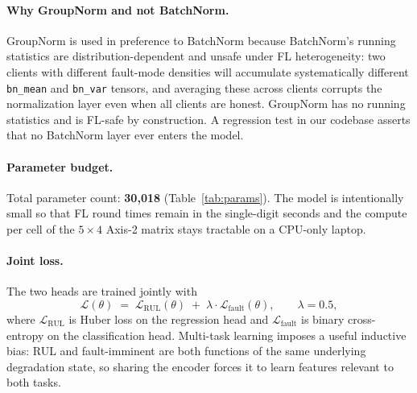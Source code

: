 \documentclass[preprint,12pt,authoryear]{elsarticle}
\begin{document}
\paragraph{Why GroupNorm and not BatchNorm.}
GroupNorm is used in preference to BatchNorm because BatchNorm's
running statistics are distribution-dependent and unsafe under FL
heterogeneity: two clients with different fault-mode densities will
accumulate systematically different \texttt{bn\_mean} and
\texttt{bn\_var} tensors, and averaging these across clients
corrupts the normalization layer even when all clients are honest.
GroupNorm has no running statistics and is FL-safe by construction.
A regression test in our codebase asserts that no BatchNorm layer
ever enters the model.

\paragraph{Parameter budget.}
Total parameter count: \textbf{30{,}018} (Table~\ref{tab:params}).
The model is intentionally small so that FL round times remain in
the single-digit seconds and the compute per cell of the
$5 \times 4$ Axis-2 matrix stays tractable on a CPU-only laptop.

\paragraph{Joint loss.}
The two heads are trained jointly with
\begin{equation}
    \mathcal{L}(\theta) \;=\; \mathcal{L}_{\mathrm{RUL}}(\theta) \;+\; \lambda \cdot \mathcal{L}_{\mathrm{fault}}(\theta),
    \qquad \lambda = 0.5,
    \label{eq:loss}
\end{equation}
where $\mathcal{L}_{\mathrm{RUL}}$ is Huber loss on the regression
head and $\mathcal{L}_{\mathrm{fault}}$ is binary cross-entropy on
the classification head. Multi-task learning imposes a useful
inductive bias: RUL and fault-imminent are both functions of the
same underlying degradation state, so sharing the encoder forces it
to learn features relevant to both tasks.
\end{document}
